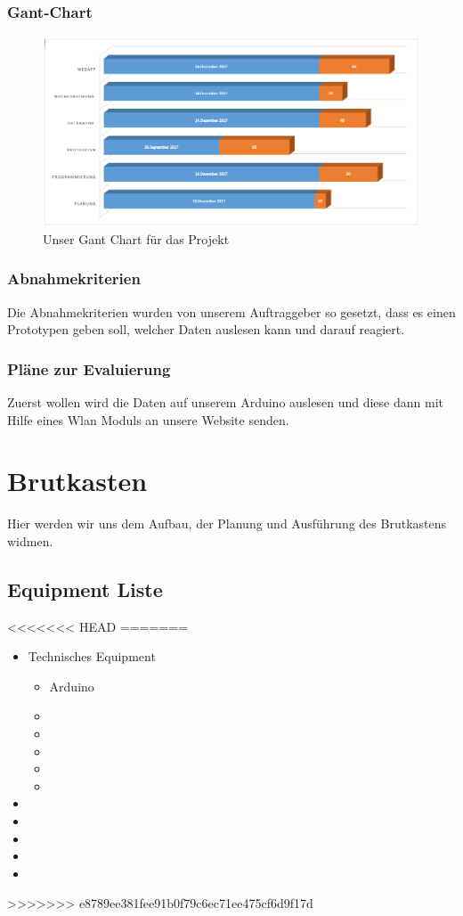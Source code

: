 \subsection{Gant-Chart}
  
\begin{figure} 
\hspace*{-2cm}
\includegraphics[width=530pt]{figures/Gant}
\caption{Unser Gant Chart für das Projekt} 
\end{figure}
\subsection{Abnahmekriterien}
Die Abnahmekriterien wurden von unserem Auftraggeber so gesetzt, dass es einen Prototypen geben soll, welcher Daten auslesen kann und darauf reagiert.
\subsection{Pläne zur Evaluierung}
Zuerst wollen wird die Daten auf unserem Arduino auslesen und diese dann mit Hilfe eines Wlan Moduls an unsere Website senden.


\chapter{Brutkasten}
 Hier werden wir uns dem Aufbau, der Planung und  Ausführung des Brutkastens widmen. 
\section{Equipment Liste}
<<<<<<< HEAD
=======
\begin{itemize}
	\item Technisches Equipment
	\begin{itemize}
		\item Arduino
		\item 
		\item 
		\item 
		\item 
		\item 
	\end{itemize}
	\item
	\item
	\item
	\item
	\item
\end{itemize}
>>>>>>> e8789ee381fee91b0f79c6ec71ee475cf6d9f17d

